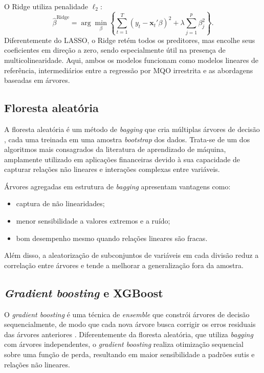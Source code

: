 O Ridge utiliza penalidade $\ell_2$:
\[
\hat{\beta}^{\text{Ridge}} = \arg\min_{\beta}
    \left\{ \sum_{t=1}^{T}(y_t - \mathbf{x}_t'\beta)^2
            + \lambda \sum_{j=1}^{p} \beta_j^2 \right\}.
\]
Diferentemente do LASSO, o Ridge retém todos os preditores, mas encolhe seus
coeficientes em direção a zero, sendo especialmente útil na presença de
multicolinearidade. Aqui, ambos os modelos funcionam como
modelos lineares de referência, intermediários entre a regressão por MQO
irrestrita e as abordagens baseadas em árvores.

\subsection{Floresta aleatória}

A floresta aleatória é um método de \textit{bagging} que cria múltiplas árvores de
decisão \citep{breiman2001randomforest}, cada uma treinada em uma amostra
\textit{bootstrap} dos dados. Trata-se de um dos algoritmos mais consagrados da
literatura de aprendizado de máquina, amplamente utilizado em aplicações
financeiras devido à sua capacidade de capturar relações não lineares e
interações complexas entre variáveis.

Árvores agregadas em estrutura de \textit{bagging} apresentam vantagens como:

\begin{itemize}
    \item captura de não linearidades;
    \item menor sensibilidade a valores extremos e a ruído;
    \item bom desempenho mesmo quando relações lineares são fracas.
\end{itemize}

Além disso, a aleatorização de subconjuntos de variáveis em cada divisão reduz a
correlação entre árvores e tende a melhorar a generalização fora da amostra.

\subsection{\textit{Gradient boosting} e XGBoost}

O \textit{gradient boosting} é uma técnica de \textit{ensemble} que constrói
árvores de decisão sequencialmente, de modo que cada nova árvore busca corrigir
os erros residuais das árvores anteriores \citep{friedman2001gradientboosting}.
Diferentemente da floresta aleatória, que utiliza \textit{bagging} com árvores
independentes, o \textit{gradient boosting} realiza otimização sequencial sobre
uma função de perda, resultando em maior sensibilidade a padrões sutis e
relações não lineares.

